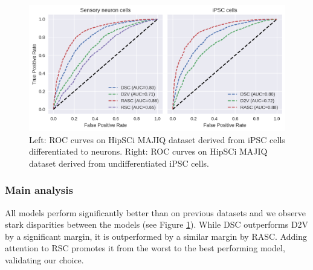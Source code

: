 \begin{figure}
	\centering\includegraphics[width=1\textwidth]{../visualizations/ch5-results/majiq_neuron_ipsc_cross_model_roc_auc_comparison.png} 
	\caption{Left: ROC curves on HipSCi MAJIQ dataset derived from iPSC cells differentiated to neurons. Right: ROC curves on HipSCi MAJIQ dataset derived from undifferentiated iPSC cells. }
	\label{fig:majiq_rocs}
\end{figure}

\subsubsection{Main analysis}
All models perform significantly better than on previous datasets and we observe stark disparities between the models (see Figure \ref{fig:majiq_rocs}). While DSC outperforms D2V by a significant margin, it is outperformed by a similar margin by RASC. Adding attention to RSC promotes it from the worst to the best performing model, validating our choice. 





